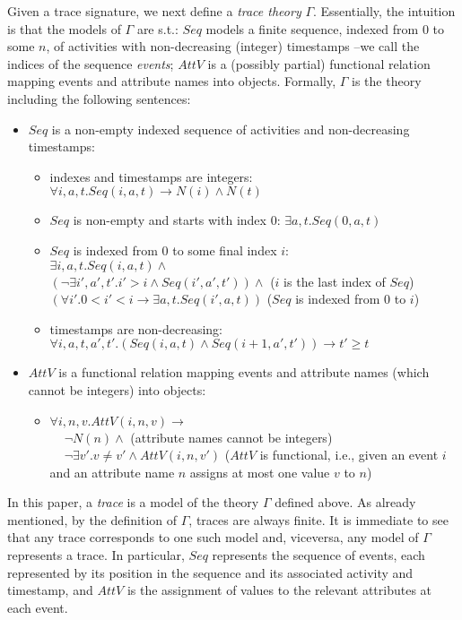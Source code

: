 Given a trace signature, we next define a \emph{trace theory} $\Gamma$.
Essentially, the intuition is that the models of $\Gamma$ are s.t.: $Seq$
models a finite sequence, indexed from $0$ to some $n$, of activities with
non-decreasing (integer) timestamps --we call the indices of the
sequence \emph{events};
$AttV$ is a (possibly partial) functional relation mapping
events and attribute names into objects.
Formally, $\Gamma$ is the theory including the following sentences:
\begin{itemize}
	\item $Seq$ is a non-empty indexed sequence of activities and
non-decreasing timestamps:	
		\begin{itemize}
			\item
			indexes and timestamps are integers: $\forall
i,a,t.Seq(i,a,t)\rightarrow N(i)\land N(t)$
			\item $Seq$ is non-empty and starts with index 0: $\exists
a,t.Seq(0,a,t)$
			\item $Seq$ is indexed from $0$ to some final index $i$:\\			
			$\exists i,a,t.Seq(i,a,t)\land $\\
		\phantom{x}$
			(\lnot\exists i',a',t'.i'>i\land Seq(i',a',t'))\land $
($i$ is the last index of $Seq$)\\
		\phantom{x}$(\forall i'.0<i'<i\rightarrow \exists
a,t.Seq(i',a,t))$ ($Seq$ is indexed from 0 to $i$)
			\item timestamps are non-decreasing:\\
				$\forall i,a,t,a',t'.(Seq(i,a,t)\land
Seq(i+1,a',t'))\rightarrow t'\geq t$
		\end{itemize}
		
	\item $AttV$ is a functional relation mapping events and attribute names
(which cannot be integers) into objects:
	\begin{itemize}	
		\item $\forall i,n,v.AttV(i,n,v)\rightarrow$\\
			$\phantom{xx}\lnot N(n)\land$ (attribute names cannot be
integers)\\
			$\phantom{xx}\lnot\exists v'.v\neq v'\land AttV(i,n,v')$ ($AttV$ is
functional, i.e., given an event $i$ and an attribute name $n$ assigns at
most one value $v$ to $n$)
	\end{itemize}
\end{itemize}
In this paper, a \emph{trace} is a model of the theory $\Gamma$ defined
above. As already mentioned, by the definition of
$\Gamma$, traces are always finite.
It is immediate to see that any trace corresponds to one such model and,
viceversa, any model of
$\Gamma$ represents a trace.
In particular, $Seq$ represents the sequence of events, each represented by
its position in the sequence and its associated activity and timestamp, and
$AttV$ is the assignment of values to the relevant attributes at each event.

